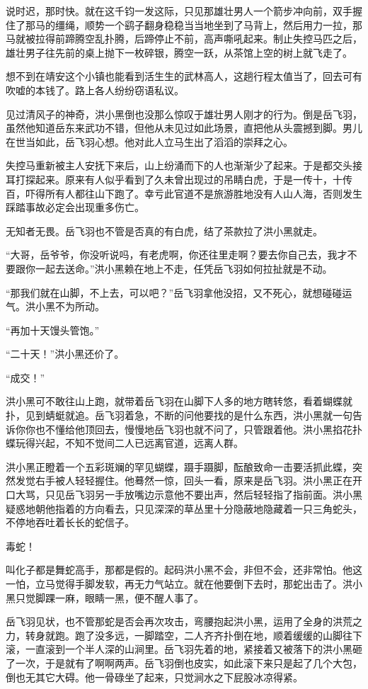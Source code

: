 说时迟，那时快。就在这千钧一发这际，只见那雄壮男人一个箭步冲向前，双手握住了那马的缰绳，顺势一个鹞子翻身稳稳当当地坐到了马背上，然后用力一拉，那马就被拉得前蹄腾空乱扑腾，后蹄停止不前，高声嘶吼起来。制止失控马匹之后，雄壮男子往先前的桌上抛下一枚碎银，腾空一跃，从茶馆上空的树上就飞走了。

想不到在靖安这个小镇也能看到活生生的武林高人，这趟行程太值当了，回去可有吹嘘的本钱了。路上各人纷纷窃语私议。

见过清风子的神奇，洪小黑倒也没那么惊叹于雄壮男人刚才的行为。倒是岳飞羽，虽然他知道岳东来武功不错，但他从未见过如此场景，直把他从头震撼到脚。男儿在世当如此，岳飞羽心想。他对此人立马生出了滔滔的崇拜之心。

失控马重新被主人安抚下来后，山上纷涌而下的人也渐渐少了起来。于是都交头接耳打探起来。原来有人似乎看到了久未曾出现过的吊睛白虎，于是一传十，十传百，吓得所有人都往山下跑了。幸亏此官道不是旅游胜地没有人山人海，否则发生踩踏事故必定会出现重多伤亡。

无知者无畏。岳飞羽也不管是否真的有白虎，结了茶款拉了洪小黑就走。

“大哥，岳爷爷，你没听说吗，有老虎啊，你还往里走啊？要去你自己去，我才不要跟你一起去送命。”洪小黑赖在地上不走，任凭岳飞羽如何拉扯就是不动。

“那我们就在山脚，不上去，可以吧？”岳飞羽拿他没招，又不死心，就想碰碰运气。洪小黑不为所动。

“再加十天馒头管饱。”

“二十天！”洪小黑还价了。

“成交！”

洪小黑可不敢往山上跑，就带着岳飞羽在山脚下人多的地方瞎转悠，看着蝴蝶就扑，见到蜻蜓就追。岳飞羽着急，不断的问他要找的是什么东西，洪小黑就一句告诉你你也不懂给他顶回去，慢慢地岳飞羽也就不问了，只管跟着他。洪小黑掐花扑蝶玩得兴起，不知不觉间二人已远离官道，远离人群。

洪小黑正瞪着一个五彩斑斓的罕见蝴蝶，蹑手蹑脚，酝酿致命一击要活抓此蝶，突然发觉右手被人轻轻握住。他蓦然一惊，回头一看，原来是岳飞羽。洪小黑正在开口大骂，只见岳飞羽另一手放嘴边示意他不要出声，然后轻轻指了指前面。洪小黑疑惑地朝他指着的方向看去，只见深深的草丛里十分隐蔽地隐藏着一只三角蛇头，不停地吞吐着长长的蛇信子。

毒蛇！

叫化子都是舞蛇高手，那都是假的。起码洪小黑不会，非但不会，还非常怕。他这一怕，立马觉得手脚发软，再无力气站立。就在他要倒下去时，那蛇出击了。洪小黑只觉脚踝一麻，眼睛一黑，便不醒人事了。

岳飞羽见状，也不管那蛇是否会再次攻击，弯腰抱起洪小黑，运用了全身的洪荒之力，转身就跑。跑了没多远，一脚踏空，二人齐齐扑倒在地，顺着缓缓的山脚往下滚，一直滚到一个半人深的山涧里。岳飞羽先着的地，紧接着又被落下的洪小黑砸了一次，于是就有了啊啊两声。岳飞羽倒也皮实，如此滚下来只是起了几个大包，倒也无其它大碍。他一骨碌坐了起来，只觉涧水之下屁股冰凉得紧。

